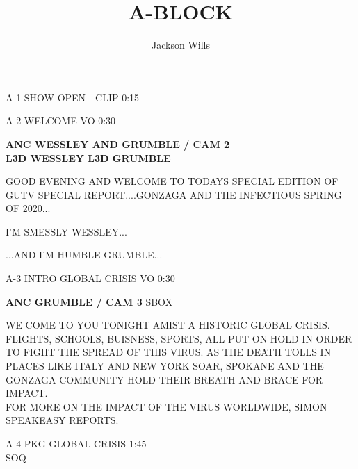 \documentclass{article}
\title{A-BLOCK}
\author{Jackson Wills}
\newenvironment{changemargin}[2]{%
\begin{list}{}{%
\setlength{\topsep}{0pt}%
\setlength{\leftmargin}{#1}%
\setlength{\rightmargin}{#2}%
\setlength{\listparindent}{\parindent}%
\setlength{\itemindent}{\parindent}%
\setlength{\parsep}{\parskip}%
}%
\item[]}{\end{list}}
\begin{document}
\maketitle
\begin{flushleft}
\begin{changemargin}{-3cm}{-5cm}
\color{red}
A-1     SHOW OPEN - CLIP  0:15
\vspace{5mm}

A-2      WELCOME  VO   0:30


\color{black}
\textbf{
ANC WESSLEY AND GRUMBLE / CAM 2} \\

\textbf{
L3D WESSLEY L3D GRUMBLE
}
\end{changemargin}

\begin{changemargin}{4cm}{1cm}
GOOD EVENING AND WELCOME TO TODAYS SPECIAL EDITION OF GUTV SPECIAL REPORT....GONZAGA AND THE INFECTIOUS SPRING OF 2020...

\vspace{5mm}

I'M SMESSLY WESSLEY...

\vspace{5mm}

...AND I'M HUMBLE GRUMBLE...
\end{changemargin}




\begin{changemargin}{-3cm}{-5cm}
\color{red}
A-3     INTRO GLOBAL CRISIS  VO   0:30

\color{black}

\textbf{
ANC GRUMBLE / CAM 3}
\color{red}
SBOX
\end{changemargin}

\color{black}
\begin{changemargin}{4cm}{1cm}
WE COME TO YOU TONIGHT AMIST A HISTORIC GLOBAL CRISIS. FLIGHTS, SCHOOLS, BUISNESS, SPORTS, ALL PUT ON HOLD IN ORDER TO FIGHT THE SPREAD OF THIS VIRUS. AS THE DEATH TOLLS IN PLACES LIKE ITALY AND NEW YORK SOAR, SPOKANE AND THE GONZAGA COMMUNITY HOLD THEIR BREATH AND BRACE FOR IMPACT. \\
FOR MORE ON THE IMPACT OF THE VIRUS WORLDWIDE, SIMON SPEAKEASY REPORTS.

\end{changemargin}

\begin{changemargin}{-3cm}{-5cm}
\color{red}
A-4     PKG GLOBAL CRISIS  1:45
\\
SOQ


\end{changemargin}
\end{flushleft}
\end{document}

